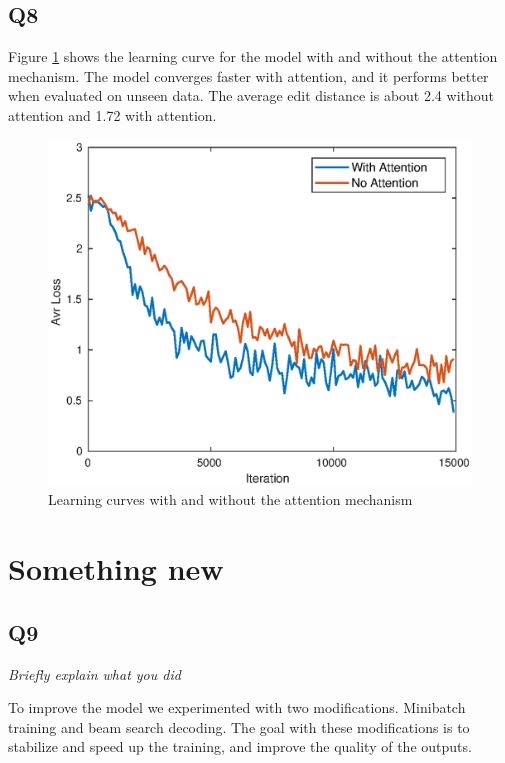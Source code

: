 \documentclass[12pt]{article}
\begin{document}
\subsection{Q8}

Figure \ref{fig_attention} shows the learning curve for the model with and without the attention mechanism. The model converges faster with attention, and it performs better when evaluated on unseen data. The average edit distance is about 2.4 without attention and 1.72 with attention.

\begin{figure}[h]
    \centering
    \includegraphics[width=\linewidth]{img/attention2.eps}
    \caption{Learning curves with and without the attention mechanism}
    \label{fig_attention}
\end{figure}



\section{Something new}

\subsection{Q9}
\textit{Briefly explain what you did}

To improve the model we experimented with two modifications. Minibatch training and beam search decoding. The goal with these modifications is to stabilize and speed up the training, and improve the quality of the outputs.
\end{document}
